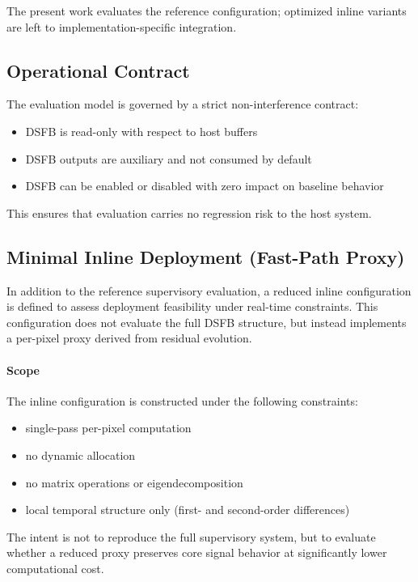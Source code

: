 \documentclass[11pt,letterpaper]{article}
\theoremstyle{gcresult}
\theoremstyle{definition}
\begin{document}
The present work evaluates the reference configuration; optimized inline variants are left to implementation-specific integration.


\subsection{Operational Contract}
The evaluation model is governed by a strict non-interference contract:
\begin{itemize}
    \item DSFB is read-only with respect to host buffers
    \item DSFB outputs are auxiliary and not consumed by default
    \item DSFB can be enabled or disabled with zero impact on baseline behavior
\end{itemize}

This ensures that evaluation carries no regression risk to the host system.


\subsection{Minimal Inline Deployment (Fast-Path Proxy)}

In addition to the reference supervisory evaluation, a reduced inline configuration is defined to assess deployment feasibility under real-time constraints. This configuration does not evaluate the full DSFB structure, but instead implements a per-pixel proxy derived from residual evolution.

\paragraph{Scope}

The inline configuration is constructed under the following constraints:
\begin{itemize}
    \item single-pass per-pixel computation
    \item no dynamic allocation
    \item no matrix operations or eigendecomposition
    \item local temporal structure only (first- and second-order differences)
\end{itemize}

The intent is not to reproduce the full supervisory system, but to evaluate whether a reduced proxy preserves core signal behavior at significantly lower computational cost.
\end{document}
